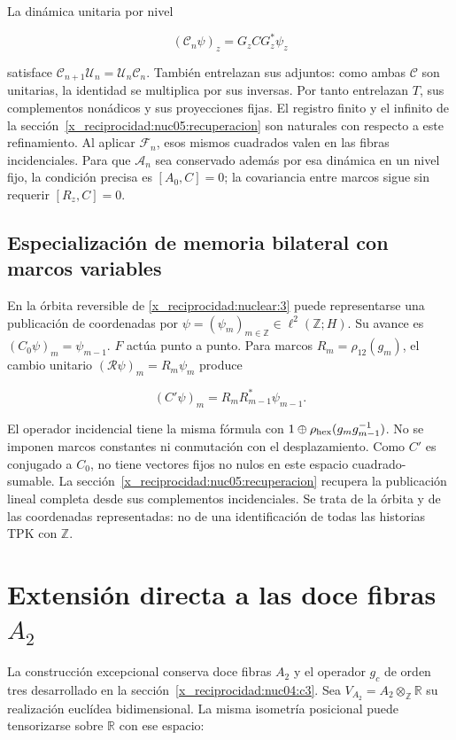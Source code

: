 La dinámica unitaria por nivel

\[
(\mathscr C_n\psi)_z=G_zCG_z^*\psi_z
\]

satisface \(\mathscr C_{n+1}\mathscr U_n=\mathscr U_n\mathscr C_n\). También entrelazan sus adjuntos: como ambas \(\mathscr C\) son unitarias, la identidad se multiplica por sus inversas. Por tanto entrelazan \(T\), sus complementos nonádicos y sus proyecciones fijas. El registro finito y el infinito de la sección~\ref{x_reciprocidad:nuc05:recuperacion} son naturales con respecto a este refinamiento. Al aplicar \(\mathscr F_n\), esos mismos cuadrados valen en las fibras incidenciales. Para que \(\mathscr A_n\) sea conservado además por esa dinámica en un nivel fijo, la condición precisa es \([A_0,C]=0\); la covariancia entre marcos sigue sin requerir \([R_z,C]=0\).

\subsection{Especialización de memoria bilateral con marcos variables}

En la órbita reversible de \cref{x_reciprocidad:nuclear:3} puede representarse una publicación de coordenadas por \(\psi=(\psi_m)_{m\in\mathbb Z}\in\ell^2(\mathbb Z;H)\). Su avance es \((C_0\psi)_m=\psi_{m-1}\). \(F\) actúa punto a punto. Para marcos \(R_m=\rho_{12}(g_m)\), el cambio unitario \((\mathscr R\psi)_m=R_m\psi_m\) produce

\[
(C'\psi)_m=R_mR_{m-1}^*\psi_{m-1}.
\]

El operador incidencial tiene la misma fórmula con \(1\oplus\rho_{\rm hex}(g_mg_{m-1}^{-1})\). No se imponen marcos constantes ni conmutación con el desplazamiento. Como \(C'\) es conjugado a \(C_0\), no tiene vectores fijos no nulos en este espacio cuadrado-sumable. La sección~\ref{x_reciprocidad:nuc05:recuperacion} recupera la publicación lineal completa desde sus complementos incidenciales. Se trata de la órbita y de las coordenadas representadas: no de una identificación de todas las historias TPK con \(\mathbb Z\).

\section{Extensión directa a las doce fibras \texorpdfstring{\(A_2\)}{A2}}\label{x_reciprocidad:nuc05:a2}

La construcción excepcional conserva doce fibras \(A_2\) y el operador \(g_c\) de orden tres desarrollado en la sección~\ref{x_reciprocidad:nuc04:c3}. Sea \(V_{A_2}=A_2\otimes_{\mathbb Z}\mathbb R\) su realización euclídea bidimensional. La misma isometría posicional puede tensorizarse sobre \(\mathbb R\) con ese espacio:

